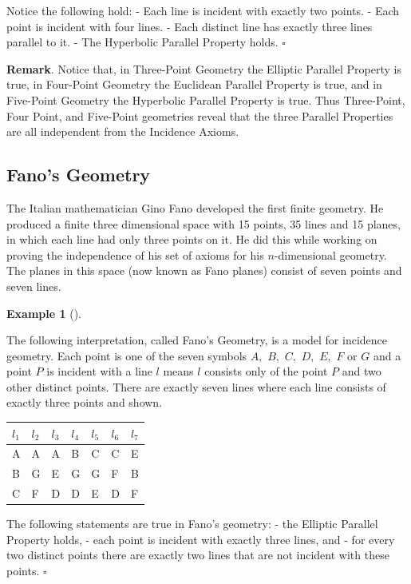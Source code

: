 \documentclass[
  twoside,
  12pt,
  letterpaper,
  fleqn]{article}
\theoremstyle{definition}
\theoremstyle{definition}
\newtheorem{example}{Example}[section]
\theoremstyle{plain}
\theoremstyle{plain}
\theoremstyle{remark}
\begin{document}
Notice the following hold: - Each line is incident with exactly two
points. - Each point is incident with four lines. - Each distinct line
has exactly three lines parallel to it. - The Hyperbolic Parallel
Property holds. \(\square\)

\textbf{Remark}. Notice that, in Three-Point Geometry the Elliptic
Parallel Property is true, in Four-Point Geometry the Euclidean Parallel
Property is true, and in Five-Point Geometry the Hyperbolic Parallel
Property is true. Thus Three-Point, Four Point, and Five-Point
geometries reveal that the three Parallel Properties are all independent
from the Incidence Axioms.

\hypertarget{fanos-geometry}{%
\subsection{Fano's Geometry}\label{fanos-geometry}}

The Italian mathematician Gino Fano developed the first finite geometry.
He produced a finite three dimensional space with 15 points, 35 lines
and 15 planes, in which each line had only three points on it. He did
this while working on proving the independence of his set of axioms for
his \(n\)-dimensional geometry. The planes in this space (now known as
Fano planes) consist of seven points and seven lines.

\begin{example}[]\protect\hypertarget{exm-ano-geometry}{}\label{exm-ano-geometry}

The following interpretation, called Fano's Geometry, is a model for
incidence geometry. Each point is one of the seven symbols \(A,\) \(B,\)
\(C,\) \(D,\) \(E,\) \(F\) or \(G\) and a point \(P\) is incident with a
line \(l\) means \(l\) consists only of the point \(P\) and two other
distinct points. There are exactly seven lines where each line consists
of exactly three points and shown.

\begin{longtable}[]{@{}lllllll@{}}
\toprule()
\(l_1\) & \(l_2\) & \(l_3\) & \(l_4\) & \(l_5\) & \(l_6\) & \(l_7\) \\
\midrule()
\endhead
A & A & A & B & C & C & E \\
B & G & E & G & G & F & B \\
C & F & D & D & E & D & F \\
\bottomrule()
\end{longtable}

The following statements are true in Fano's geometry: - the Elliptic
Parallel Property holds, - each point is incident with exactly three
lines, and - for every two distinct points there are exactly two lines
that are not incident with these points. \(\square\)

\end{example}
\end{document}
